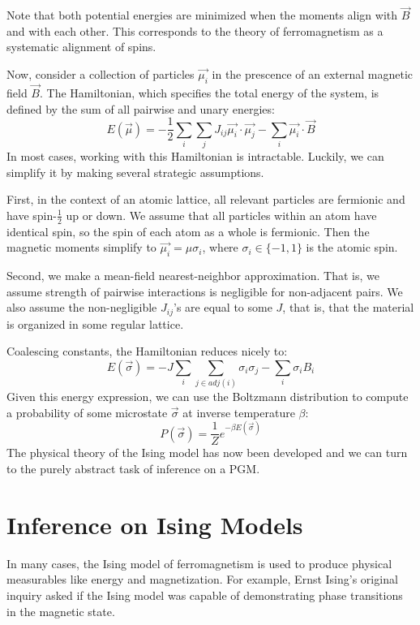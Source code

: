 \documentclass{article}
\begin{document}
Note that both potential energies are minimized when the moments align with 
$\vec{B}$ and with each other. 
This corresponds to the theory of ferromagnetism as a systematic alignment of 
spins. 

Now, consider a collection of particles $\vec{\mu_i}$ in the prescence of an 
external magnetic field $\vec{B}$. 
The Hamiltonian, which specifies the total energy of the system, is defined by 
the sum of all pairwise and unary energies:
\begin{equation}\label{eq:exactE}
    E(\vec{\mu}) = -\frac{1}{2}\sum_i \sum_j J_{ij} \vec{\mu_i} \cdot \vec{\mu_j} - \sum_i \vec{\mu_i} \cdot \vec{B}
\end{equation}
In most cases, working with this Hamiltonian is intractable. 
Luckily, we can simplify it by making several strategic assumptions. 

First, in the context of an atomic lattice, all relevant particles are fermionic 
and have spin-$\frac{1}{2}$ up or down. 
We assume that all particles within an atom have identical spin, so the spin of 
each atom as a whole is fermionic. 
Then the magnetic moments simplify to $\vec{\mu_i} = \mu \sigma_i$, where 
$\sigma_i \in \{-1, 1\}$ is the atomic spin. 

Second, we make a mean-field nearest-neighbor approximation. 
That is, we assume strength of pairwise interactions is negligible for 
non-adjacent pairs. 
We also assume the non-negligible $J_{ij}$'s are equal to some $J$, that is, 
that the material is organized in some regular lattice. 

Coalescing constants, the Hamiltonian reduces nicely to:
\begin{equation}\label{eq:isingE}
    E(\vec{\sigma}) = -J\sum_i \sum_{j \in adj(i)} \sigma_i \sigma_j - \sum_i \sigma_i B_i
\end{equation}
Given this energy expression, we can use the Boltzmann distribution to compute a 
probability of some microstate $\vec{\sigma}$ at inverse temperature $\beta$:
\begin{equation} \label{eq:boltzmann}
    P(\vec{\sigma}) = \frac{1}{Z}e^{-\beta E(\vec{\sigma})} 
\end{equation}
The physical theory of the Ising model has now been developed and we can turn to 
the purely abstract task of inference on a PGM. 
%
%
%
%
%
\section{Inference on Ising Models}
%
%
%
%
%
In many cases, the Ising model of ferromagnetism is used to produce physical 
measurables like energy and magnetization. 
For example, Ernst Ising's original inquiry asked if the Ising model was capable 
of demonstrating phase transitions in the magnetic state. 
\end{document}
